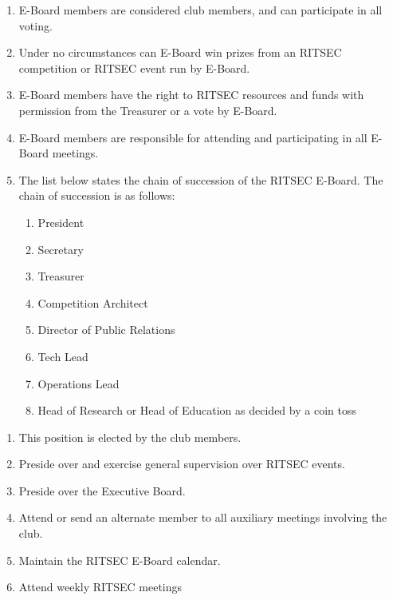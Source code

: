 


\begin{enumerate}
  \item E-Board members are considered club members, and can participate in all
    voting.
  \item Under no circumstances can E-Board win prizes from an RITSEC
    competition or RITSEC event run by E-Board.
  \item E-Board members have the right to RITSEC resources and funds with
    permission from the Treasurer or a vote by E-Board.
  \item E-Board members are responsible for attending and participating in all
    E-Board meetings.
  \item The list below states the chain of succession of the RITSEC E-Board.
    The chain of succession is as follows:
  \begin{enumerate}
    \item President
    \item Secretary
    \item Treasurer
    \item Competition Architect 
    \item Director of Public Relations
    \item Tech Lead
    \item Operations Lead
    \item Head of Research or Head of Education as decided by a coin toss
  \end{enumerate}
\end{enumerate}


\begin{enumerate}
  \item This position is elected by the club members.
  \item Preside over and exercise general supervision over RITSEC events. 
  \item Preside over the Executive Board.
  \item Attend or send an alternate member to all auxiliary meetings involving
    the club.
  \item Maintain the RITSEC E-Board calendar.
  \item Attend weekly RITSEC meetings
\end{enumerate}

